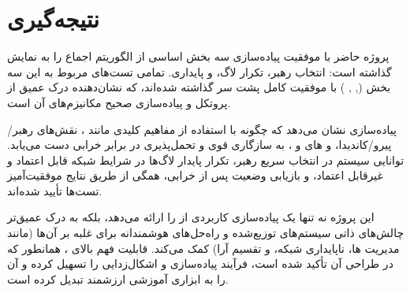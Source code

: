 \documentclass[12pt,a4paper]{article}
\begin{document}
\section{نتیجه‌گیری}

پروژه حاضر با موفقیت پیاده‌سازی سه بخش اساسی از الگوریتم اجماع  را به نمایش گذاشته است: انتخاب رهبر، تکرار لاگ، و پایداری. تمامی تست‌های مربوط به این سه بخش (, , ) با موفقیت کامل پشت سر گذاشته شده‌اند، که نشان‌دهنده درک عمیق از پروتکل و پیاده‌سازی صحیح مکانیزم‌های آن است.

پیاده‌سازی نشان می‌دهد که چگونه  با استفاده از مفاهیم کلیدی مانند ، نقش‌های رهبر/پیرو/کاندیدا، و های  و ، به سازگاری قوی و تحمل‌پذیری در برابر خرابی دست می‌یابد. توانایی سیستم در انتخاب سریع رهبر، تکرار پایدار لاگ‌ها در شرایط شبکه قابل اعتماد و غیرقابل اعتماد، و بازیابی وضعیت پس از خرابی، همگی از طریق نتایج موفقیت‌آمیز تست‌ها تأیید شده‌اند.

این پروژه نه تنها یک پیاده‌سازی کاربردی از  را ارائه می‌دهد، بلکه به درک عمیق‌تر چالش‌های ذاتی سیستم‌های توزیع‌شده و راه‌حل‌های هوشمندانه  برای غلبه بر آن‌ها (مانند مدیریت ها، ناپایداری شبکه، و تقسیم آرا) کمک می‌کند. قابلیت فهم بالای ، همانطور که در طراحی آن تأکید شده است، فرآیند پیاده‌سازی و اشکال‌زدایی را تسهیل کرده و آن را به ابزاری آموزشی ارزشمند تبدیل کرده است.
\end{document}
